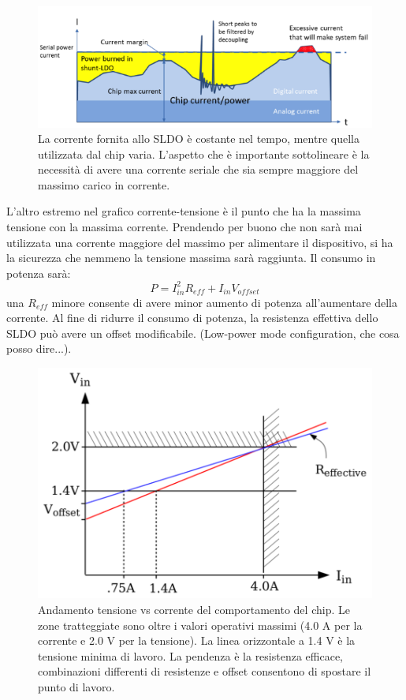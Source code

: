 \begin{figure}
\centering
\includegraphics[scale=.5]{Immagini/ShuntRegulatorPrinciple}
\caption{La corrente fornita allo SLDO è costante nel tempo, mentre quella utilizzata dal chip varia. L'aspetto che è importante sottolineare è la necessità di avere una corrente seriale che sia sempre maggiore del massimo carico in corrente.}
\label{SLDOprinciple}
\end{figure}
L'altro estremo nel grafico corrente-tensione è il punto che ha la massima tensione con la massima corrente. Prendendo per buono che non sarà mai utilizzata una corrente maggiore del massimo per alimentare il dispositivo, si ha la sicurezza che nemmeno la tensione massima sarà raggiunta. 
Il consumo in potenza sarà:
\begin{equation}
 P=I_{in}^2R_{eff}+I_{in}V_{offset}
\end{equation}
una $R_{eff}$ minore consente di avere minor aumento di potenza all'aumentare della corrente. 
Al fine di ridurre il consumo di potenza, la resistenza effettiva dello SLDO può avere un offset modificabile. (Low-power mode configuration, che cosa posso dire...).

\begin{figure}
\centering
\includegraphics[scale=.3]{Immagini/VoltageVsCurrent}
\caption{Andamento tensione vs corrente del comportamento del chip. Le zone tratteggiate sono oltre i valori operativi massimi (4.0 A per la corrente e 2.0 V per la tensione). La linea orizzontale a 1.4 V è la tensione minima di lavoro. La pendenza è la resistenza efficace, combinazioni differenti di resistenze e offset consentono di spostare il punto di lavoro.}
\label{VVC}
\end{figure}

